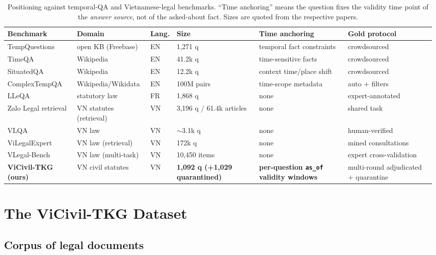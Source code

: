 \documentclass[10pt,a4paper,twocolumn]{article}
\newcommand{\code}[1]{\texttt{#1}}
\begin{document}
\begin{table}[t]
\centering\scriptsize
\caption{Positioning against temporal-QA and Vietnamese-legal benchmarks. ``Time anchoring'' means the question fixes the validity time point of the \emph{answer source}, not of the asked-about fact. Sizes are quoted from the respective papers.}
\label{tab:related}
\setlength{\tabcolsep}{3.2pt}
\begin{tabular}{llllll}
\toprule
Benchmark & Domain & Lang. & Size & Time anchoring & Gold protocol \\
\midrule
TempQuestions \cite{jia2018tempquestions} & open KB (Freebase) & EN & 1{,}271 q & temporal fact constraints & crowdsourced \\
TimeQA \cite{chen2021timeqa} & Wikipedia & EN & 41.2k q & time-sensitive facts & crowdsourced \\
SituatedQA \cite{zhang2021situatedqa} & Wikipedia & EN & 12.2k q & context time/place shift & crowdsourced \\
ComplexTempQA \cite{gruber2025complextempqa} & Wikipedia/Wikidata & EN & 100M pairs & time-scope metadata & auto + filters \\
LLeQA \cite{louis2024lleqa} & statutory law & FR & 1{,}868 q & none & expert-annotated \\
Zalo Legal retrieval \cite{zalolegal2019} & VN statutes (retrieval) & VN & 3{,}196 q / 61.4k articles & none & shared task \\
VLQA \cite{vu2025vlqa} & VN law & VN & $\sim$3.1k q & none & human-verified \\
ViLegalExpert \cite{vilegalexpert2026} & VN law (retrieval) & VN & 172k q & none & mined consultations \\
VLegal-Bench \cite{vlegalbench2025} & VN law (multi-task) & VN & 10{,}450 items & none & expert cross-validation \\
\midrule
\textbf{ViCivil-TKG (ours)} & VN civil statutes & VN & \textbf{1,092 q (+1,029 quarantined)} & \textbf{per-question \code{as\_of} validity windows} & multi-round adjudicated + quarantine \\
\bottomrule
\end{tabular}
\end{table}

\section{The ViCivil-TKG Dataset}

\subsection{Corpus of legal documents}
\end{document}
